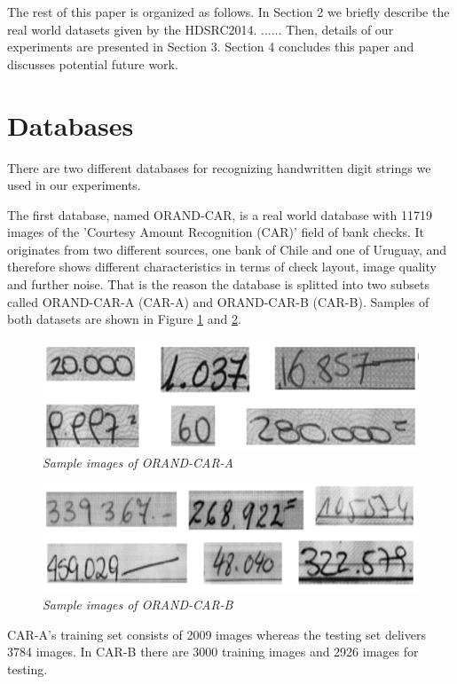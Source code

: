 The rest of this paper is organized as follows. In Section 2 we briefly describe the real world datasets given by the HDSRC2014. ...... Then, details of our experiments are presented in Section 3. Section 4 concludes this paper and discusses potential future work.

\section{Databases} \label{Datasets}
There are two different databases for recognizing handwritten digit strings we used in our experiments.

The first database, named ORAND-CAR, is a real world database with 11719 images of the 'Courtesy Amount Recognition (CAR)' field of bank checks. It originates from two different sources, one bank of Chile and one of Uruguay, and therefore shows different characteristics in terms of check layout, image quality and further noise. That is the reason the database is splitted into two subsets called ORAND-CAR-A (CAR-A) and ORAND-CAR-B (CAR-B). Samples of both datasets are shown in Figure \ref{fig:carA} and \ref{fig:carB}.

\begin{figure}
  \includegraphics[width=\linewidth]{images/CAR-A-Splitted.png}
  \caption{\it Sample images of ORAND-CAR-A}
  \label{fig:carA}
\end{figure}

\begin{figure}
  \includegraphics[width=\linewidth]{images/CAR-B-Splitted.png}
  \caption{\it Sample images of ORAND-CAR-B}
  \label{fig:carB}
\end{figure}

CAR-A's training set consists of 2009 images whereas the testing set delivers 3784 images. In CAR-B there are 3000 training images and 2926 images for testing.

